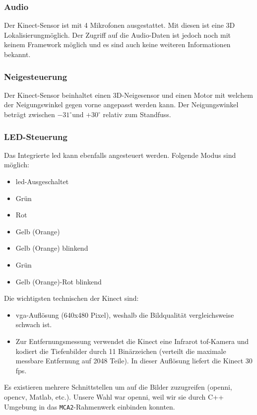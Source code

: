\subsubsection{Audio}

Der Kinect-Sensor ist mit 4 Mikrofonen ausgestattet. Mit diesen ist eine 3D Lokalisierungmöglich. Der Zugriff auf die Audio-Daten ist jedoch noch mit keinem Framework möglich und es sind auch keine weiteren Informationen bekannt.

\subsubsection{Neigesteuerung}

Der Kinect-Sensor beinhaltet einen 3D-Neigesensor und einen Motor mit welchem der Neigungswinkel gegen vorne angepasst werden kann. Der Neigungswinkel beträgt zwischen $-31^\circ$und $+30^\circ$ relativ zum Standfuss.

\subsubsection{LED-Steuerung}

Das Integrierte \gls{led} kann ebenfalls angesteuert werden. Folgende Modus sind möglich:

\begin{itemize}
	\item \gls{led}-Ausgeschaltet
	\item Grün
	\item Rot
	\item Gelb (Orange)
	\item Gelb (Orange) blinkend
	\item Grün
	\item Gelb (Orange)-Rot blinkend
\end{itemize}

\noindent Die wichtigsten technischen der Kinect sind:
\begin{itemize}
  \item \gls{vga}-Auflösung (640x480 Pixel), weshalb die Bildqualität vergleichsweise
  schwach ist.
  \item Zur Entfernungsmessung verwendet die Kinect eine Infrarot \gls{tof}-Kamera und kodiert
  die Tiefenbilder durch 11 Binärzeichen (verteilt die maximale messbare
  Entfernung auf 2048 Teile). In dieser Auflösung liefert die Kinect 30 \gls{fps}.
\end{itemize}

Es existieren mehrere Schnittstellen um auf die Bilder zuzugreifen (\gls{openni}, \gls{opencv}, Matlab, etc.).
 Unsere Wahl war \gls{openni}, weil wir sie durch C++ Umgebung in das
 \lstinline{MCA2}-Rahmenwerk einbinden konnten.

